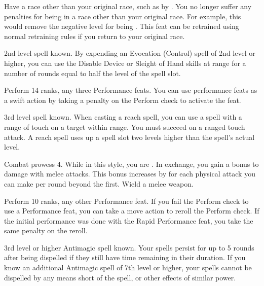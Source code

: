 \label{Racial Acclimation}
\featpre Have a race other than your original race, such as by .
\featben You no longer suffer any penalties for being in a race other than your original race.
For example, this would remove the negative level for being .
This feat can be retrained using normal retraining rules if you return to your original race.

\featpre 2nd level spell known.
\featben By expending an Evocation (Control) spell of 2nd level or higher, you can use the Disable Device or Sleight of Hand skills at \rngclose range for a number of rounds equal to half the level of the spell slot.

\featpres Perform 14 ranks, any three Performance feats.
\featben You can use performance feats as a swift action by taking a  penalty on the Perform check to activate the feat.

\featpre 3rd level spell known.
\featben When casting a reach spell, you can use a spell with a range of touch on a target within \rngclose range.
You must succeed on a ranged touch attack.
A reach spell uses up a spell slot two levels higher than the spell's actual level.

\featpre Combat prowess 4.
\featben While in this style, you are .
In exchange, you gain a  bonus to damage with melee attacks.
This bonus increases by  for each physical attack you can make per round beyond the first.
\stylereq Wield a melee weapon.

\featpres Perform 10 ranks, any other Performance feat.
\featben If you fail the Perform check to use a Performance feat, you can take a move action to reroll the Perform check.
If the initial performance was done with the Rapid Performance feat, you take the same  penalty on the reroll.

\featpre 3rd level or higher Antimagic spell known.
\featben Your spells persist for up to 5 rounds after being dispelled if they still have time remaining in their duration.
If you know an additional Antimagic spell of 7th level or higher, your spells cannot be dispelled by any means short of the  spell, or other effects of similar power.

